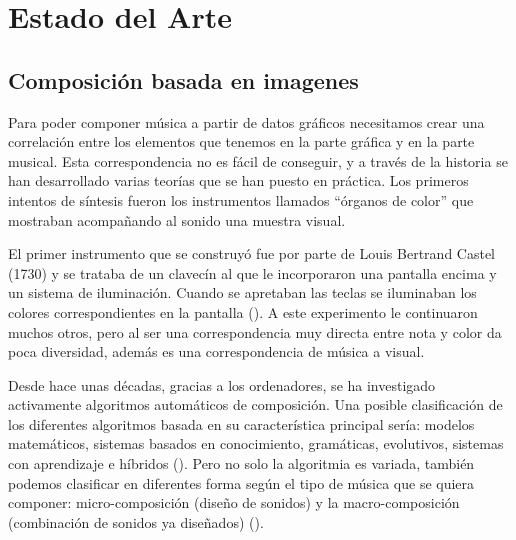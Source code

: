 \section{Estado del Arte}
\label{sec:estadodelarte}




\subsection{Composición basada en imagenes}


Para poder componer música a partir de datos gráficos necesitamos crear una correlación entre los elementos que tenemos en la parte gráfica y en la parte musical. Esta correspondencia no es fácil de conseguir, y a través de la historia se han desarrollado varias teorías que se han puesto en práctica. Los primeros intentos de síntesis fueron los instrumentos llamados ``órganos de color'' que mostraban acompañando al sonido una muestra visual.

El primer instrumento que se construyó fue por parte de Louis Bertrand Castel (1730) y se trataba de un clavecín al que le incorporaron una pantalla encima y un sistema de iluminación. Cuando se apretaban las teclas se iluminaban los colores correspondientes en la pantalla (\cite{organosColor}). A este experimento le continuaron muchos otros, pero al ser una correspondencia muy directa entre nota y color da poca diversidad, además es una correspondencia de música a visual.

Desde hace unas décadas, gracias a los ordenadores, se ha investigado activamente algoritmos automáticos de composición. Una posible clasificación de los diferentes algoritmos basada en su característica principal sería: modelos matemáticos, sistemas basados en conocimiento, gramáticas, evolutivos, sistemas con aprendizaje e híbridos (\cite{AIMethodsForComposition}). Pero no solo la algoritmia es variada, también podemos clasificar en diferentes forma según el tipo de música que se quiera componer: micro-composición (diseño de sonidos) y la macro-composición (combinación de sonidos ya diseñados) (\cite{AudioVisualSurvey}).

